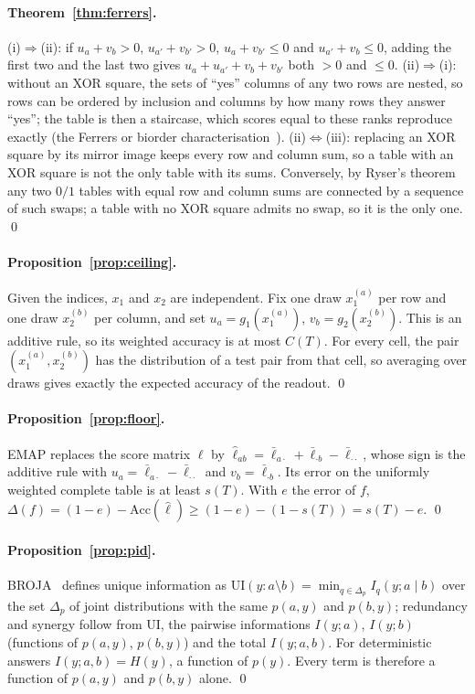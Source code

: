 \paragraph{Theorem~\ref{thm:ferrers}.}
(i)$\Rightarrow$(ii): if $u_a+v_b>0$, $u_{a'}+v_{b'}>0$, $u_a+v_{b'}\le 0$ and $u_{a'}+v_b\le 0$,
adding the first two and the last two gives $u_a+u_{a'}+v_b+v_{b'}$ both $>0$ and $\le 0$.
(ii)$\Rightarrow$(i): without an XOR square, the sets of ``yes'' columns of any two rows are
nested, so rows can be ordered by inclusion and columns by how many rows they answer ``yes'';
the table is then a staircase, which scores equal to these ranks reproduce exactly
(the Ferrers or biorder characterisation~\cite{ducamp1969composite,doignon1984realizable}).
(ii)$\Leftrightarrow$(iii): replacing an XOR square by its mirror image keeps every row and
column sum, so a table with an XOR square is not the only table with its sums. Conversely, by
Ryser's theorem~\cite{ryser1957combinatorial} any two $0/1$ tables with equal row and column
sums are connected by a sequence of such swaps; a table with no XOR square admits no swap, so
it is the only one. \qed

\paragraph{Proposition~\ref{prop:ceiling}.}
Given the indices, $x_1$ and $x_2$ are independent. Fix one draw $x_1^{(a)}$ per row and one
draw $x_2^{(b)}$ per column, and set $u_a=g_1(x_1^{(a)})$, $v_b=g_2(x_2^{(b)})$. This is an
additive rule, so its weighted accuracy is at most $C(T)$. For every cell, the pair
$(x_1^{(a)},x_2^{(b)})$ has the distribution of a test pair from that cell, so averaging over
draws gives exactly the expected accuracy of the readout. \qed

\paragraph{Proposition~\ref{prop:floor}.}
EMAP replaces the score matrix $\ell$ by $\hat\ell_{ab}=\bar\ell_{a\cdot}+\bar\ell_{\cdot b}-\bar\ell_{\cdot\cdot}$,
whose sign is the additive rule with $u_a=\bar\ell_{a\cdot}-\bar\ell_{\cdot\cdot}$ and
$v_b=\bar\ell_{\cdot b}$. Its error on the uniformly weighted complete table is at least $s(T)$.
With $e$ the error of $f$, $\Delta(f)=(1-e)-\mathrm{Acc}(\hat\ell)\ge(1-e)-(1-s(T))=s(T)-e$. \qed

\paragraph{Proposition~\ref{prop:pid}.}
BROJA~\cite{bertschinger2014quantifying} defines unique information as
$\mathrm{UI}(y{:}a\setminus b)=\min_{q\in\Delta_p} I_q(y;a\mid b)$ over the set $\Delta_p$ of joint
distributions with the same $p(a,y)$ and $p(b,y)$; redundancy and synergy follow from UI, the
pairwise informations $I(y;a)$, $I(y;b)$ (functions of $p(a,y)$, $p(b,y)$) and the total
$I(y;a,b)$. For deterministic answers $I(y;a,b)=H(y)$, a function of $p(y)$. Every term is
therefore a function of $p(a,y)$ and $p(b,y)$ alone. \qed

